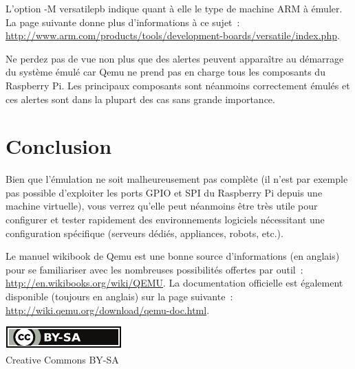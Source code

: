 \documentclass{article}
\begin{document}
L'option \og{}-M versatilepb\fg{} indique quant à elle le type de machine ARM à
émuler. La page suivante donne plus d'informations à ce sujet~:
\url{http://www.arm.com/products/tools/development-boards/versatile/index.php}.

Ne perdez pas de vue non plus que des alertes peuvent apparaître au démarrage
du système émulé car Qemu ne prend pas en charge tous les composants du
Raspberry Pi. Les principaux composants sont néanmoins correctement émulés et
ces alertes sont dans la plupart des cas sans grande importance.



\section*{Conclusion}\label{sec:ccl}

Bien que l'émulation ne soit malheureusement pas complète (il n'est par exemple
pas possible d'exploiter les ports GPIO et SPI du Raspberry Pi depuis une
machine virtuelle), vous verrez qu'elle peut néanmoins être très utile pour
configurer et tester rapidement des environnements logiciels nécessitant une
configuration spécifique (serveurs dédiés, appliances, robots, etc.).
 
Le manuel wikibook de Qemu est une bonne source d'informations (en anglais)
pour se familiariser avec les nombreuses possibilités offertes par outil~:
\url{http://en.wikibooks.org/wiki/QEMU}.
La documentation officielle est également disponible (toujours en anglais) sur la
page suivante~: \url{http://wiki.qemu.org/download/qemu-doc.html}.



\nocite{*}                    %




\ifpdf
    \vfill %
    \begin{center}
        \href{http://creativecommons.org/licenses/by-sa/4.0/}{\includegraphics[width=.15\linewidth]{fig/cc_by_sa_small}}\\
        \small{Creative Commons BY-SA}
    \end{center}
\else
\end{document}
